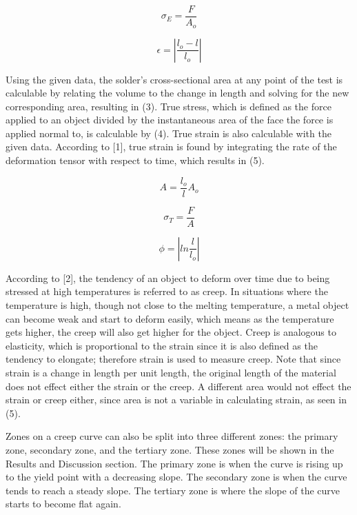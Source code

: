 \documentclass[12pt]{article}
\begin{document}
\bigskip
\begin{equation}
\sigma_{E} = \frac{F}{A_{o}}
\end{equation}
\bigskip


\begin{equation}
\epsilon = \left | \frac{l_{o}-l}{l_{o}} \right |
\end{equation}
\bigskip

Using the given data, the solder's cross-sectional area at any point of the test is calculable by relating the volume to the change in length and solving for the new corresponding area, resulting in (3). True stress, which is defined as the force applied to an object divided by the instantaneous area of the face the force is applied normal to, is calculable by (4). True strain is also calculable with the given data. According to [1], true strain is found by integrating the rate of the deformation tensor with respect to time, which results in (5).

\begin{equation}
A = \frac{l_{o}}{l}A_{o}
\end{equation}
\bigskip

\begin{equation}
\sigma_{T} = \frac {F}{A}
\end{equation}
\bigskip

\begin{equation}
\phi = \left | ln \frac{l}{l_{o}} \right |
\end{equation}
\bigskip

According to [2], the tendency of an object to deform over time due to being stressed at high temperatures is referred to as creep. In situations where the temperature is high, though not close to the melting temperature, a metal object can become weak and start to deform easily, which means as the temperature gets higher, the creep will also get higher for the object. Creep is analogous to elasticity, which is proportional to the strain since it is also defined as the tendency to elongate; therefore strain is used to measure creep. Note that since strain is a change in length per unit length, the original length of the material does not effect either the strain or the creep. A different area would not effect the strain or creep either, since area is not a variable in calculating strain, as seen in (5).
\bigskip

Zones on a creep curve can also be split into three different zones: the primary zone, secondary zone, and the tertiary zone. These zones will be shown in the Results and Discussion section. The primary zone is when the curve is rising up to the yield point with a decreasing slope. The secondary zone is when the curve tends to reach a steady slope. The tertiary zone is where the slope of the curve starts to become flat again.
\bigskip
\end{document}
